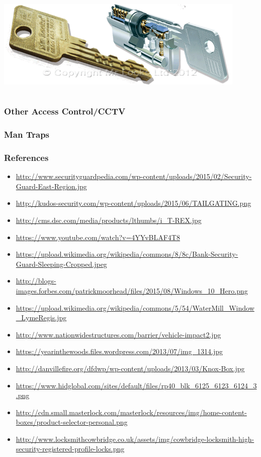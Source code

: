 \documentclass[]{beamer}
\begin{document}
\begin{frame}
\begin{columns}[c]
    \includegraphics[width=0.9\textwidth]{high-sec-lock}
  \end{columns}

\end{frame}

\begin{frame}
  \frametitle{Other Access Control/CCTV}
\end{frame}

\begin{frame}
  \frametitle{Man Traps}
\end{frame}

\begin{frame}
  \frametitle{References}
  \begin{itemize}
    \item \url{http://www.securityguardpedia.com/wp-content/uploads/2015/02/Security-Guard-East-Region.jpg}
    \item \url{http://kudos-security.com/wp-content/uploads/2015/06/TAILGATING.png}
    \item \url{http://cms.dsc.com/media/products/lthumbs/i_T-REX.jpg}
    \item \url{https://www.youtube.com/watch?v=4YYvBLAF4T8}
    \item \url{https://upload.wikimedia.org/wikipedia/commons/8/8c/Bank-Security-Guard-Sleeping-Cropped.jpeg}
    \item \url{http://blogs-images.forbes.com/patrickmoorhead/files/2015/08/Windows_10_Hero.png}
    \item \url{https://upload.wikimedia.org/wikipedia/commons/5/54/WaterMill_Window_LymeRegis.jpg}
    \item \url{http://www.nationwidestructures.com/barrier/vehicle-impact2.jpg}
    \item \url{https://yearinthewoods.files.wordpress.com/2013/07/img_1314.jpg}
    \item \url{http://danvillefire.org/dfdwp/wp-content/uploads/2013/03/Knox-Box.jpg}
    \item \url{https://www.hidglobal.com/sites/default/files/rp40_blk_6125_6123_6124_3.png}
    \item \url{http://cdn.small.masterlock.com/masterlock/resources/img/home-content-boxes/product-selector-personal.png}
    \item \url{http://www.locksmithcowbridge.co.uk/assets/img/cowbridge-locksmith-high-security-registered-profile-locks.png}
  \end{itemize}

\end{frame}
\end{document}
